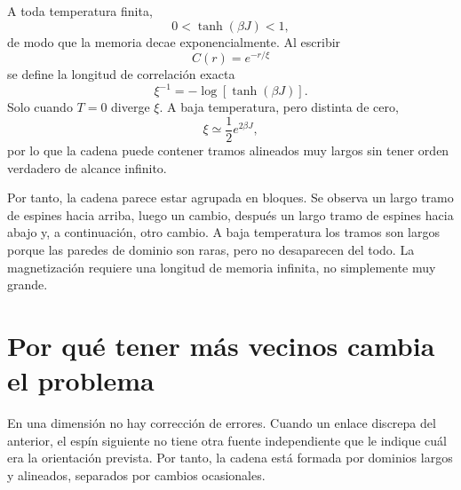 \begin{classroomqa}
\end{classroomqa}

A toda temperatura finita,
\begin{equation}
0<\tanh(\beta J)<1,
\end{equation}
de modo que la memoria decae exponencialmente. Al escribir
\begin{equation}
C(r)=e^{-r/\xi}
\end{equation}
se define la longitud de correlación exacta
\begin{equation}
\xi^{-1}=-\log\!\left[\tanh(\beta J)\right].
\label{eq:correlation-length}
\end{equation}
Solo cuando \(T=0\) diverge \(\xi\). A baja temperatura, pero distinta de cero,
\begin{equation}
\xi\simeq \frac{1}{2}e^{2\beta J},
\end{equation}
por lo que la cadena puede contener tramos alineados muy largos sin tener orden verdadero de alcance infinito.

Por tanto, la cadena parece estar agrupada en bloques. Se observa un largo tramo de espines hacia arriba, luego un cambio, después un largo tramo de espines hacia abajo y, a continuación, otro cambio. A baja temperatura los tramos son largos porque las paredes de dominio son raras, pero no desaparecen del todo. La magnetización requiere una longitud de memoria infinita, no simplemente muy grande.

\section{Por qué tener más vecinos cambia el problema}

En una dimensión no hay corrección de errores. Cuando un enlace discrepa del anterior, el espín siguiente no tiene otra fuente independiente que le indique cuál era la orientación prevista. Por tanto, la cadena está formada por dominios largos y alineados, separados por cambios ocasionales.

